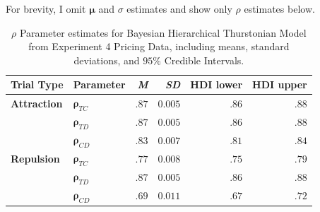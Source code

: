 For brevity, I omit $\boldsymbol{\mu}$ and $\sigma$ estimates and show only $\rho$ estimates below.
\begin{table}[ht]
    \centering
    \begin{tabular}{llrrrr}
        \toprule
        Trial Type & Parameter & \textit{M} & \textit{SD} & HDI lower & HDI upper \\
        \midrule
        \textbf{Attraction}  &  $\boldsymbol{\rho}_{TC}$     &    $.87$   &   $0.005$    &  $.86$     & $.88$     \\
                             &  $\boldsymbol{\rho}_{TD}$    &     $.87$   &   $0.005$    &  $.86$     & $.88$     \\
                             &  $\boldsymbol{\rho}_{CD}$    &     $.83$   &   $0.007$    &  $.81$     & $.84$     \\
        \textbf{Repulsion}   &  $\boldsymbol{\rho}_{TC}$     &    $.77$   &   $0.008$    &  $.75$     & $.79$     \\
                             &  $\boldsymbol{\rho}_{TD}$    &     $.87$   &   $0.005$    &  $.86$     & $.88$     \\
                             &  $\boldsymbol{\rho}_{CD}$    &     $.69$   &   $0.011$     &  $.67$     & $.72$     \\
        \bottomrule
    \end{tabular}
    \caption{$\rho$ Parameter estimates for Bayesian Hierarchical Thurstonian Model from Experiment 4 Pricing Data, including means, standard deviations, and $95\%$ Credible Intervals.}
    \label{tab:e4_rho_params}
\end{table}
